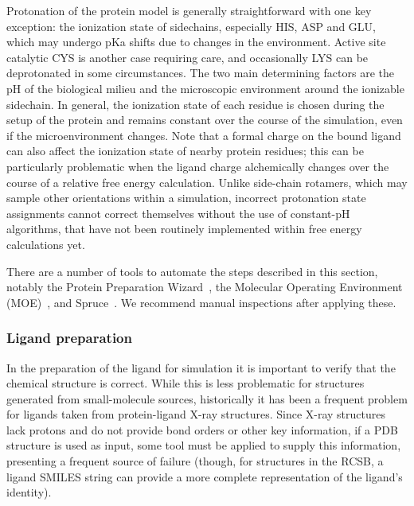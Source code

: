 \documentclass[9pt,bestpractices,pubversion]{livecoms}
\begin{document}
Protonation of the protein model is generally straightforward with one key exception: the ionization state of sidechains, especially HIS, ASP and GLU, which may undergo pKa shifts due to changes in the environment. Active site catalytic CYS is another case requiring care, and occasionally LYS can be deprotonated in some circumstances. The two main determining factors are the pH of the biological milieu and the microscopic environment around the ionizable sidechain. In general, the ionization state of each residue is chosen during the setup of the protein and remains constant over the course of the simulation, even if the microenvironment changes. 
Note that a formal charge on the bound ligand can also affect the ionization state of nearby protein residues; this can be particularly problematic when the ligand charge alchemically changes over the course of a relative free energy calculation. Unlike side-chain rotamers, which may sample other orientations within a simulation, incorrect protonation state assignments cannot correct themselves without the use of constant-pH algorithms, that have not been routinely implemented within free energy calculations yet. 

There are a number of tools to automate the steps described in this section, notably the Protein Preparation Wizard~\cite{madhavisastry_protein_2013}, the Molecular Operating Environment (MOE)~\cite{moe_2021}, and Spruce~\cite{openeye_spruce}. We recommend manual inspections after applying these.

\subsubsection{Ligand preparation}
\label{sec:ligprep}

In the preparation of the ligand for simulation it is important to verify that the chemical structure is correct. While this is less problematic for structures generated from small-molecule sources, historically it has been a frequent problem for ligands taken from protein-ligand X-ray structures. Since X-ray structures lack protons and do not provide bond orders or other key information, if a PDB structure is used as input, some tool must be applied to supply this information, presenting a frequent source of failure (though, for structures in the RCSB, a ligand SMILES string can provide a more complete representation of the ligand's identity).
\end{document}
